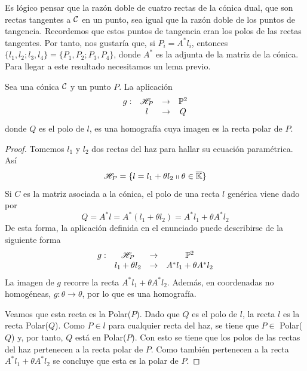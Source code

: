 Es lógico pensar que la razón doble de cuatro rectas de la cónica dual, que son rectas tangentes a $\mathcal{C}$ en un punto, sea igual que la razón doble de los puntos de tangencia. Recordemos que estos puntos de tangencia eran los polos de las rectas tangentes. Por tanto, nos gustaría que, si $P_i=A^*l_i$, entonces $\{l_1,l_2;l_3,l_4\}=\{P_1,P_2;P_3,P_4\}$, donde $A^*$ es la adjunta de la matriz de la cónica. Para llegar a este resultado necesitamos un lema previo.
\begin{lem}
	Sea una cónica $\mathcal{C}$ y un punto $P$. La aplicación
	\begin{equation}
		\begin{array}{cccc}
		g:&\mathscr{H}_P&\rightarrow &\mathbb{P}^2\\
		&l&\rightarrow & Q
		\end{array}
	\end{equation}
	donde $Q$ es el polo de $l$, es una homografía cuya imagen es la recta polar de $P$.
\end{lem}
\begin{proof}
	Tomemos $l_1$ y $l_2$ dos rectas del haz para hallar su ecuación paramétrica. Así
	\begin{equation*}
		\mathscr{H}_P=\{l=l_1+\theta l_2\shortparallel\theta\in\overline{\mathbb{K}}\}
	\end{equation*}
	Si $C$ es la matriz asociada a la cónica, el polo de una recta $l$ genérica viene dado por
	\begin{equation*}
		Q=A^*l=A^*(l_1+\theta l_2)=A^*l_1+\theta A^*l_2
	\end{equation*}
	De esta forma, la aplicación definida en el enunciado puede describirse de la siguiente forma
	\begin{equation*}
		\begin{array}{cccc}
		g:&\mathscr{H}_P&\rightarrow &\mathbb{P}^2\\
		&l_1+\theta l_2&\rightarrow & A^*l_1+\theta A^*l_2
		\end{array}
	\end{equation*}
	La imagen de $g$ recorre la recta $A^*l_1+\theta A^*l_2$. Además, en coordenadas no homogéneas, $g:\theta\rightarrow \theta$, por lo que es una homografía.
	
	Veamos que esta recta es la Polar($P$). Dado que $Q$ es el polo de $l$, la recta $l$ es la recta Polar($Q$). Como $P\in l$ para cualquier recta del haz, se tiene que $P\in$ Polar($Q$) y, por tanto, $Q$ está en Polar($P$). Con esto se tiene que los polos de las rectas del haz pertenecen a la recta polar de $P$. Como también pertenecen a la recta $A^*l_1+\theta A^*l_2$ se concluye que esta es la polar de $P$.
\end{proof}
